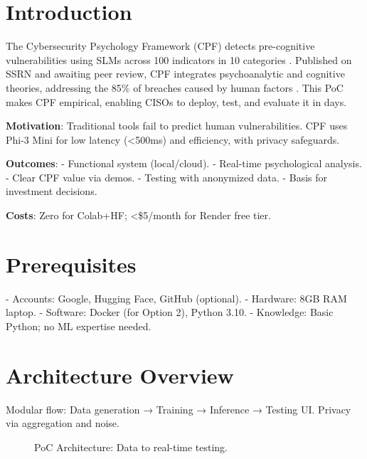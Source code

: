 \documentclass[11pt,a4paper]{article}
\begin{document}
\newpage
\tableofcontents
\newpage

\section{Introduction}

The Cybersecurity Psychology Framework (CPF) detects pre-cognitive vulnerabilities using SLMs across 100 indicators in 10 categories \cite{cpf2025}. Published on SSRN and awaiting peer review, CPF integrates psychoanalytic and cognitive theories, addressing the 85\% of breaches caused by human factors \cite{verizon2023}. This PoC makes CPF empirical, enabling CISOs to deploy, test, and evaluate it in days.

\textbf{Motivation}: Traditional tools fail to predict human vulnerabilities. CPF uses Phi-3 Mini for low latency (<500ms) and efficiency, with privacy safeguards.

\textbf{Outcomes}:
- Functional system (local/cloud).
- Real-time psychological analysis.
- Clear CPF value via demos.
- Testing with anonymized data.
- Basis for investment decisions.

\textbf{Costs}: Zero for Colab+HF; <\$5/month for Render free tier.

\section{Prerequisites}

- Accounts: Google, Hugging Face, GitHub (optional).
- Hardware: 8GB RAM laptop.
- Software: Docker (for Option 2), Python 3.10.
- Knowledge: Basic Python; no ML expertise needed.

\section{Architecture Overview}

Modular flow: Data generation → Training → Inference → Testing UI. Privacy via aggregation and noise.

\begin{figure}[H]
\centering
{}
\caption{PoC Architecture: Data to real-time testing.}
\label{fig:architecture}
\end{figure}
\end{document}

